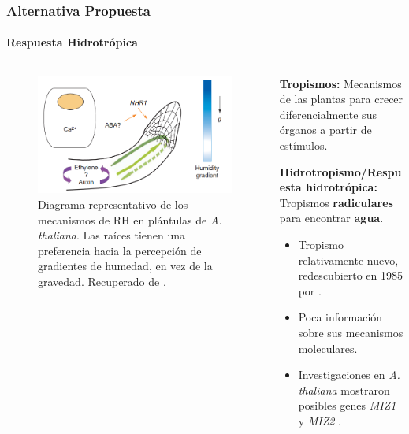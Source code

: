 \documentclass[9pt,aspectratio=169]{beamer}
\begin{document}
\begin{frame}
  \frametitle{Alternativa Propuesta}
  \framesubtitle{Respuesta Hidrotrópica}

  \begin{columns}[c]

    \begin{column}{0.45\textwidth}
      \begin{figure}[htb]
        \centering
        \includegraphics[width=\textwidth]{root-hydrotropism.png}
        \caption{Diagrama representativo de los mecanismos de RH en plántulas de \textit{A. thaliana}. Las raíces tienen una preferencia hacia la percepción de gradientes de humedad, en vez de la gravedad. Recuperado de \textcite{eapen-2005-hidrotropismo}.}
        \label{fig:root-hydrotropism}
      \end{figure}
    \end{column}

    \begin{column}{0.45\textwidth}
      {\small\color{darkgray}
      \textbf{Tropismos:} Mecanismos de las plantas para crecer diferencialmente sus órganos a partir de estímulos.
      }\medskip

      \textbf{Hidrotropismo/Respuesta hidrotrópica:} Tropismos \textbf{\color{PAPgreen} radiculares} para encontrar \textbf{\color{PAPlightblue} agua}. 

      \begin{itemize}
        \item Tropismo relativamente nuevo, redescubierto en 1985 por \textcite{jaffe-1985-hidrotropismo}. 
        \item Poca información sobre sus mecanismos moleculares.
        \item Investigaciones en \textit{A. thaliana} mostraron posibles genes \textit{MIZ1} \cite{kobayashi-2007-miz1} y \textit{MIZ2} \cite{miyazawa-2009-miz2}.
      \end{itemize}
      
    \end{column}
  \end{columns}

\end{frame}
\end{document}
